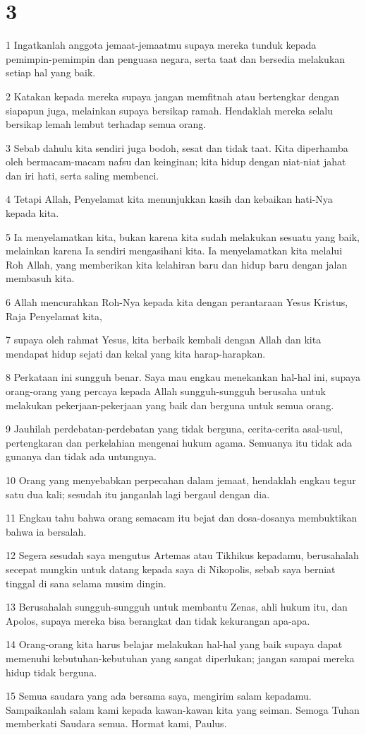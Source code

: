 \chapter{3}

\par 1 Ingatkanlah anggota jemaat-jemaatmu supaya mereka tunduk kepada pemimpin-pemimpin dan penguasa negara, serta taat dan bersedia melakukan setiap hal yang baik.
\par 2 Katakan kepada mereka supaya jangan memfitnah atau bertengkar dengan siapapun juga, melainkan supaya bersikap ramah. Hendaklah mereka selalu bersikap lemah lembut terhadap semua orang.
\par 3 Sebab dahulu kita sendiri juga bodoh, sesat dan tidak taat. Kita diperhamba oleh bermacam-macam nafsu dan keinginan; kita hidup dengan niat-niat jahat dan iri hati, serta saling membenci.
\par 4 Tetapi Allah, Penyelamat kita menunjukkan kasih dan kebaikan hati-Nya kepada kita.
\par 5 Ia menyelamatkan kita, bukan karena kita sudah melakukan sesuatu yang baik, melainkan karena Ia sendiri mengasihani kita. Ia menyelamatkan kita melalui Roh Allah, yang memberikan kita kelahiran baru dan hidup baru dengan jalan membasuh kita.
\par 6 Allah mencurahkan Roh-Nya kepada kita dengan perantaraan Yesus Kristus, Raja Penyelamat kita,
\par 7 supaya oleh rahmat Yesus, kita berbaik kembali dengan Allah dan kita mendapat hidup sejati dan kekal yang kita harap-harapkan.
\par 8 Perkataan ini sungguh benar. Saya mau engkau menekankan hal-hal ini, supaya orang-orang yang percaya kepada Allah sungguh-sungguh berusaha untuk melakukan pekerjaan-pekerjaan yang baik dan berguna untuk semua orang.
\par 9 Jauhilah perdebatan-perdebatan yang tidak berguna, cerita-cerita asal-usul, pertengkaran dan perkelahian mengenai hukum agama. Semuanya itu tidak ada gunanya dan tidak ada untungnya.
\par 10 Orang yang menyebabkan perpecahan dalam jemaat, hendaklah engkau tegur satu dua kali; sesudah itu janganlah lagi bergaul dengan dia.
\par 11 Engkau tahu bahwa orang semacam itu bejat dan dosa-dosanya membuktikan bahwa ia bersalah.
\par 12 Segera sesudah saya mengutus Artemas atau Tikhikus kepadamu, berusahalah secepat mungkin untuk datang kepada saya di Nikopolis, sebab saya berniat tinggal di sana selama musim dingin.
\par 13 Berusahalah sungguh-sungguh untuk membantu Zenas, ahli hukum itu, dan Apolos, supaya mereka bisa berangkat dan tidak kekurangan apa-apa.
\par 14 Orang-orang kita harus belajar melakukan hal-hal yang baik supaya dapat memenuhi kebutuhan-kebutuhan yang sangat diperlukan; jangan sampai mereka hidup tidak berguna.
\par 15 Semua saudara yang ada bersama saya, mengirim salam kepadamu. Sampaikanlah salam kami kepada kawan-kawan kita yang seiman. Semoga Tuhan memberkati Saudara semua. Hormat kami, Paulus.


